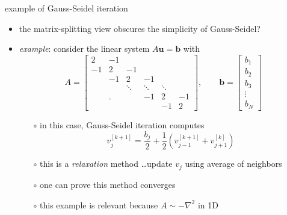 \documentclass[10pt,
               svgnames,
               hyperref={colorlinks,citecolor=DeepPink4,linkcolor=FireBrick,urlcolor=Maroon},
               usepdftitle=false]{beamer}
\newcommand{\bb}{\mathbf{b}}
\newcommand{\bu}{\mathbf{u}}
\newcommand{\grad}{\nabla}
\begin{document}
\begin{frame}{example of Gauss-Seidel iteration}
\begin{itemize}
\item the matrix-splitting view obscures the simplicity of Gauss-Seidel?
\item \emph{example}: consider the linear system $A\bu=\bb$ with
    $$A = \begin{bmatrix} 2 & -1 & & & & \\ -1 & 2 & -1 & & & \\ & -1 & 2 & -1 & & \\ & & \ddots & \ddots & \ddots & \\ & \Big. & & -1 & 2 & -1 \\ & & & & -1 & 2 \end{bmatrix}, \qquad \bb = \begin{bmatrix} b_1 \\ b_2 \\ b_3 \\ \vdots \\ b_N \end{bmatrix}$$

    \begin{itemize}
    \item[$\circ$] in this case, Gauss-Seidel iteration computes
    $$v_j^{[k+1]} = \frac{b_j}{2} + \frac{1}{2} \left(v_{j-1}^{[k+1]} + v_{j+1}^{[k]}\right)$$
    \item[$\circ$] this is a \emph{relaxation} method \dots update $v_j$ using average of neighbors
    \item[$\circ$] one can prove this method converges
    \item[$\circ$] this example is relevant because $A \sim -\grad^2$ in 1D
    \end{itemize}
\end{itemize}
\end{frame}
\end{document}
